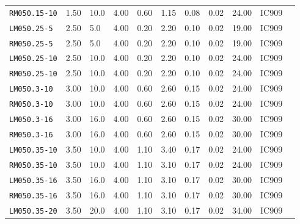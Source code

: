 \begin{table}[h!]
\begin{longtable}{l|llllllllll}
\texttt{RM050.15-10}
    &1.50
    &10.0
    &4.00
    &0.60
    &1.15
    &0.08
    &0.02
    &24.00
    &IC909
  \\


\texttt{LM050.25-5}
    &2.50
    &5.0
    &4.00
    &0.20
    &2.20
    &0.10
    &0.02
    &19.00
    &IC909
  \\


\texttt{RM050.25-5}
    &2.50
    &5.0
    &4.00
    &0.20
    &2.20
    &0.10
    &0.02
    &19.00
    &IC909
  \\


\texttt{LM050.25-10}
    &2.50
    &10.0
    &4.00
    &0.20
    &2.20
    &0.10
    &0.02
    &24.00
    &IC909
  \\


\texttt{RM050.25-10}
    &2.50
    &10.0
    &4.00
    &0.20
    &2.20
    &0.10
    &0.02
    &24.00
    &IC909
  \\


\texttt{LM050.3-10}
    &3.00
    &10.0
    &4.00
    &0.60
    &2.60
    &0.15
    &0.02
    &24.00
    &IC909
  \\


\texttt{RM050.3-10}
    &3.00
    &10.0
    &4.00
    &0.60
    &2.60
    &0.15
    &0.02
    &24.00
    &IC909
  \\


\texttt{LM050.3-16}
    &3.00
    &16.0
    &4.00
    &0.60
    &2.60
    &0.15
    &0.02
    &30.00
    &IC909
  \\


\texttt{RM050.3-16}
    &3.00
    &16.0
    &4.00
    &0.60
    &2.60
    &0.15
    &0.02
    &30.00
    &IC909
  \\


\texttt{LM050.35-10}
    &3.50
    &10.0
    &4.00
    &1.10
    &3.40
    &0.17
    &0.02
    &24.00
    &IC909
  \\


\texttt{RM050.35-10}
    &3.50
    &10.0
    &4.00
    &1.10
    &3.10
    &0.17
    &0.02
    &24.00
    &IC909
  \\


\texttt{LM050.35-16}
    &3.50
    &16.0
    &4.00
    &1.10
    &3.10
    &0.17
    &0.02
    &30.00
    &IC909
  \\


\texttt{RM050.35-16}
    &3.50
    &16.0
    &4.00
    &1.10
    &3.10
    &0.17
    &0.02
    &30.00
    &IC909
  \\


\texttt{LM050.35-20}
    &3.50
    &20.0
    &4.00
    &1.10
    &3.10
    &0.17
    &0.02
    &34.00
    &IC909
  \\



\end{longtable}
\end{table}

